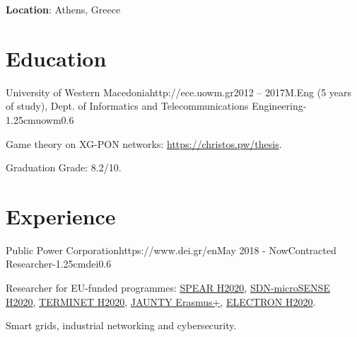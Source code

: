 \documentclass{mycv}
\begin{document}
	\thispagestyle{plain}

	\textbf{Location}: Athens, Greece

	\section{Education}
	
	\begin{EntryDatedLogo}{University of Western Macedonia}{http://ece.uowm.gr}{2012 -- 2017}{M.Eng (5 years of study), Dept. of Informatics and Telecommunications Engineering}{-1.25cm}{uowm}{0.6}
		\begin{Itemize}
			\item Game theory on XG-PON networks: \url{https://christos.pw/thesis}.
			\item Graduation Grade: 8.2/10.
		\end{Itemize}
	\end{EntryDatedLogo}
	
	\section{Experience}
		\begin{EntryDatedLogo}{Public Power Corporation}{https://www.dei.gr/en}{May 2018 - Now}{Contracted Researcher}{-1.25cm}{dei}{0.6}
		\begin{Itemize}
			\item Researcher for EU-funded programmes: \href{https://www.spear2020.eu/}{SPEAR H2020}, \href{https://www.sdnmicrosense.eu/}{SDN-microSENSE H2020}, \href{https://terminet-h2020.eu/}{TERMINET H2020}, \href{https://www.jaunty.eu/}{JAUNTY Erasmus+}, \href{https://www.electron-project.eu/}{ELECTRON H2020}.
			\item Smart grids, industrial networking and cybersecurity.
		\end{Itemize}
	\end{EntryDatedLogo}
	
\end{document}
